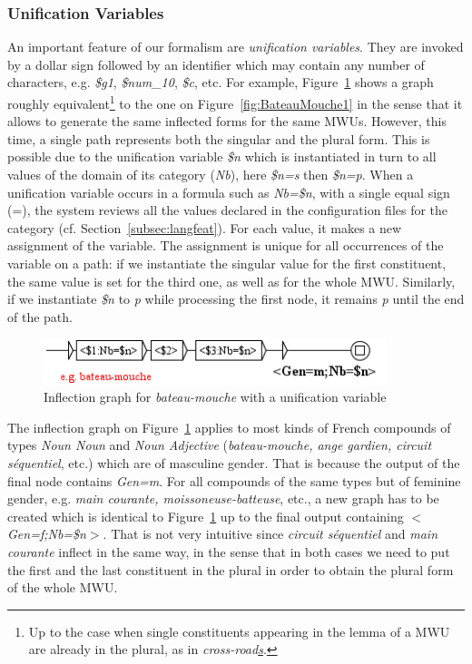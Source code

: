 \subsubsection{Unification Variables}
An important feature of our formalism are \textit{unification variables}.
They are invoked by a dollar sign followed by
an identifier which may contain any number of characters, e.g. \emph{\$g1}, \emph{\$num\_10}, \emph{\$c}, etc.
For example, Figure~\ref{fig:BateauMouche2} shows a graph roughly 
equivalent\footnote{Up to the case when single constituents appearing in the lemma 
of a MWU are already in the plural, as in \emph{cross-road\underline{s}}.} to the one 
on Figure~\ref{fig:BateauMouche1} in the sense that it allows to generate the same 
inflected forms for the same MWUs. However, this time, a single path represents both 
the singular and the plural form. This is possible due to the unification variable 
\emph{\$n} which is instantiated in turn to all values of the domain of its category (\emph{Nb}), 
here \emph{\$n=s} then \emph{\$n=p}.
When a unification variable occurs in a formula such as \emph{Nb=\$n}, with a single equal sign
(=), the system reviews all the values declared in the configuration files for the category
 (cf. Section~\ref{subsec:langfeat}). For each value, it makes a new assignment of the variable.
 The assignment is unique for all occurrences of the variable on a path: 
if we instantiate the singular value for the first constituent, the same value is set for the 
third one, as well as for the whole MWU. Similarly, if we instantiate \emph{\$n} to \emph{p} while 
processing the first node, it remains \emph{p} until the end of the path.

\begin{figure}[!htb]
  \centering
  \includegraphics[width=10cm]{resources/img/BateauMouche2.png}
  \caption{Inflection graph for \emph{bateau-mouche} with a unification variable}
  \label{fig:BateauMouche2}
\end{figure}

\bigskip
\noindent The inflection graph on Figure~\ref{fig:BateauMouche2} applies to most kinds of 
French compounds of types \emph{Noun Noun} and \emph{Noun Adjective} (\emph{bateau-mouche, 
ange gardien, circuit s\'equentiel}, etc.) which are of masculine gender. That is 
because the output of the final node contains \emph{Gen=m}. For all compounds of the same 
types but of feminine gender, e.g. \emph{main courante, moissoneuse-batteuse}, etc., a new 
graph has to be created which is identical to Figure~\ref{fig:BateauMouche2} up to the final 
output containing \emph{$<$Gen=f;Nb=\$n$>$}. That is not very intuitive since 
\emph{circuit s\'equentiel} and \emph{main courante} inflect in the same way, in the sense 
that in both cases we need to put the first and the last constituent in the plural in order to 
obtain the plural form of the whole MWU. 

